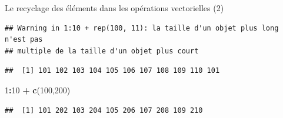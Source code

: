 \documentclass[
  ignorenonframetext,
]{beamer}
\newenvironment{Shaded}{\begin{snugshade}}{\end{snugshade}}
\newcommand{\DecValTok}[1]{\textcolor[rgb]{0.00,0.00,0.81}{#1}}
\newcommand{\FunctionTok}[1]{\textcolor[rgb]{0.13,0.29,0.53}{\textbf{#1}}}
\newcommand{\NormalTok}[1]{#1}
\newcommand{\SpecialCharTok}[1]{\textcolor[rgb]{0.81,0.36,0.00}{\textbf{#1}}}
\begin{document}
\begin{frame}[fragile]{Le recyclage des éléments dans les opérations
vectorielles (2)}
\begin{verbatim}
## Warning in 1:10 + rep(100, 11): la taille d'un objet plus long n'est pas
## multiple de la taille d'un objet plus court
\end{verbatim}

\begin{verbatim}
##  [1] 101 102 103 104 105 106 107 108 109 110 101
\end{verbatim}

\normalsize

\tiny

\begin{Shaded}
\begin{Highlighting}[]
\DecValTok{1}\SpecialCharTok{:}\DecValTok{10} \SpecialCharTok{+} \FunctionTok{c}\NormalTok{(}\DecValTok{100}\NormalTok{,}\DecValTok{200}\NormalTok{)}
\end{Highlighting}
\end{Shaded}

\begin{verbatim}
##  [1] 101 202 103 204 105 206 107 208 109 210
\end{verbatim}

\normalsize
\end{frame}
\end{document}

